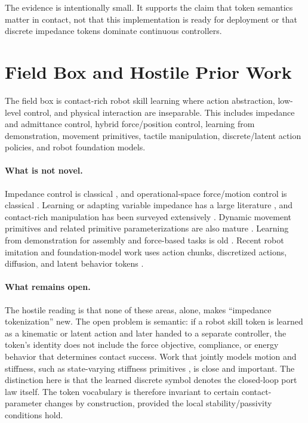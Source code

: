\documentclass{article}
\begin{document}
The evidence is intentionally small. It supports the claim that token semantics matter in contact, not that this implementation is ready for deployment or that discrete impedance tokens dominate continuous controllers.

\section{Field Box and Hostile Prior Work}

The field box is contact-rich robot skill learning where action abstraction, low-level control, and physical interaction are inseparable. This includes impedance and admittance control, hybrid force/position control, learning from demonstration, movement primitives, tactile manipulation, discrete/latent action policies, and robot foundation models.

\paragraph{What is not novel.}
Impedance control is classical \citep{hogan1985impedance}, and operational-space force/motion control is classical \citep{khatib1987operational}. Learning or adapting variable impedance has a large literature \citep{abudakka2020variable,li2018efficient}, and contact-rich manipulation has been surveyed extensively \citep{suomalainen2022survey}. Dynamic movement primitives and related primitive parameterizations are also mature \citep{ijspeert2013dynamical,saveriano2023dynamic}. Learning from demonstration for assembly and force-based tasks is old \citep{zhu2018assembly,rozo2013force}. Recent robot imitation and foundation-model work uses action chunks, discretized actions, diffusion, and latent behavior tokens \citep{zhao2023act,brohan2023rt1,chi2023diffusion,shafiullah2022bet,lee2024vqbet,han2025reactive}.

\paragraph{What remains open.}
The hostile reading is that none of these areas, alone, makes ``impedance tokenization'' new. The open problem is semantic: if a robot skill token is learned as a kinematic or latent action and later handed to a separate controller, the token's identity does not include the force objective, compliance, or energy behavior that determines contact success. Work that jointly models motion and stiffness, such as state-varying stiffness primitives \citep{khansari2014statevarying}, is close and important. The distinction here is that the learned discrete symbol denotes the closed-loop port law itself. The token vocabulary is therefore invariant to certain contact-parameter changes by construction, provided the local stability/passivity conditions hold.
\end{document}

